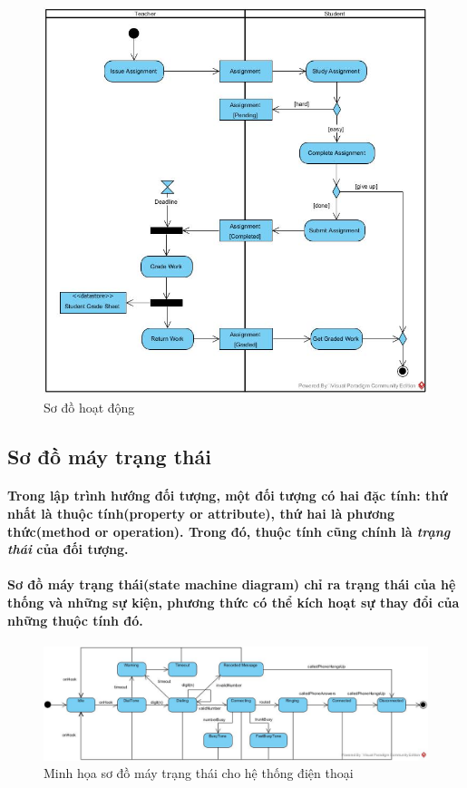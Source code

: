 \documentclass{article}
\begin{document}
  \begin{figure}[!ht]
    \centering
    \includegraphics[scale=0.4]{../pictures/diagrams/activity/activity-diagram-1.jpg}
    \caption{Sơ đồ hoạt động}
  \end{figure}

  \subsection{Sơ đồ máy trạng thái}

  \paragraph{\textnormal{
    Trong lập trình hướng đối tượng, một đối tượng có hai đặc tính: thứ nhất là thuộc tính(property or attribute), thứ hai là phương thức(method or operation). Trong đó, thuộc tính cũng chính là \textit{trạng thái} của đối tượng.
  }}
  \paragraph{\textnormal{
    Sơ đồ máy trạng thái(state machine diagram) chỉ ra trạng thái của hệ thống và những sự kiện, phương thức có thể kích hoạt sự thay đổi của những thuộc tính đó.
  }}

  \begin{figure}[!ht]
    \centering
    \includegraphics[scale=0.4]{../pictures/diagrams/statemachine/state-machine-diagram-1.jpg}
    \caption{Minh họa sơ đồ máy trạng thái cho hệ thống điện thoại}
  \end{figure}
\end{document}
